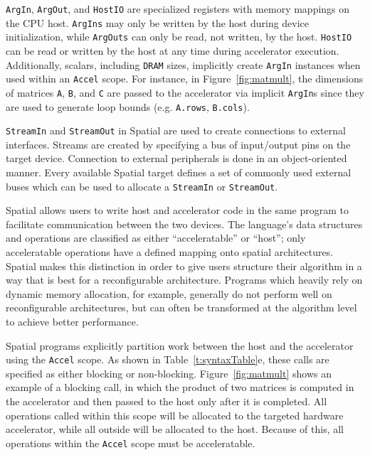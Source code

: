 \texttt{\small{ArgIn}}, \texttt{\small{ArgOut}}, and \texttt{\small{HostIO}} are specialized registers with memory mappings on the CPU host. 
\texttt{\small{ArgIns}} may only be written by the host during device initialization, while \texttt{\small{ArgOuts}} can only be read, not written, by the host. 
\texttt{\small{HostIO}} can be read or written by the host at any time during accelerator execution. 
Additionally, scalars, including \texttt{\small{DRAM}} sizes, implicitly create \texttt{\small{ArgIn}} instances when used within an \texttt{\small{Accel}} scope. For instance, in Figure~\ref{fig:matmult}, the dimensions of matrices \texttt{\small{A}}, \texttt{\small{B}}, and \texttt{\small{C}} are passed to the accelerator via implicit \texttt{\small{ArgIn}}s 
since they are used to generate loop bounds (e.g. \texttt{\small{A.rows}}, \texttt{\small{B.cols}}).


\texttt{\small{StreamIn}} and \texttt{\small{StreamOut}} in Spatial are used to create connections to external interfaces.
Streams are created by specifying a bus of input/output pins on the target device. 
Connection to external peripherals is done in an object-oriented manner. Every available Spatial target defines a set of commonly used external buses which can be used to allocate a \texttt{\small{StreamIn}} or \texttt{\small{StreamOut}}. %

Spatial allows users to write host and accelerator code in the same program to facilitate communication between the two devices. 
The language's data structures and operations are classified as either ``acceleratable'' or ``host''; only acceleratable operations have a defined mapping onto spatial architectures. 
Spatial makes this distinction in order to give users structure their algorithm in a way that is best for a reconfigurable architecture.
Programs which heavily rely on dynamic memory allocation, for example, generally do not perform well on reconfigurable architectures, but can often be transformed at the algorithm level to achieve better performance.



Spatial programs explicitly partition work between the host and the accelerator using the \texttt{\small{Accel}} scope. As shown in Table~\ref{t:syntaxTable}e, these calls are specified as either blocking or non-blocking.  Figure~\ref{fig:matmult} shows an example of a blocking call, in which the product of two
matrices is computed in the accelerator and then passed to the host only after it is completed.
All operations called within this scope will be allocated to the targeted hardware accelerator, while all outside will be allocated to the host.
Because of this, all operations within the \texttt{\small{Accel}} scope must be acceleratable.

